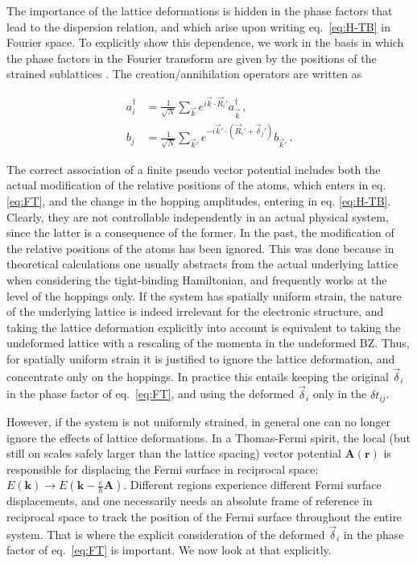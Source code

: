 The importance of the lattice deformations is hidden in the phase factors that lead to the dispersion relation, and which arise upon writing eq.~\eqref{eq:H-TB} in Fourier space.
To explicitly show this dependence, we work in the basis in which the phase factors in the Fourier transform are given by the positions of the strained sublattices \cite{Bena2009}.
The creation/annihilation operators are written as

\begin{subequations}\label{eq:FT}
\begin{align}
a_i^{\dagger}&=\frac{1}{\sqrt{N}}\sum_{\vec{k}}e^{i \vec{k}\cdot\vec{R}_i'}a_{\vec{k}}^{\dagger}\,, \\ 
b_j&=\frac{1}{\sqrt{N}}\sum_{\vec{k}'}e^{-i \vec{k}'\cdot(\vec{R}_i'+\vec{\delta}_j')}b_{\vec{k}'}\,.
\end{align}
\end{subequations}

The correct association of a finite pseudo vector potential includes both the actual modification of the relative positions of the atoms, which enters in eq. \eqref{eq:FT}, and the change in the hopping amplitudes, entering in eq. \eqref{eq:H-TB}.
Clearly, they are not controllable independently in an actual physical system, since the latter is a consequence of the former.
In the past, the modification of the relative positions of the atoms has been ignored.
This was done because in theoretical calculations one usually abstracts from the actual underlying lattice when considering the tight-binding Hamiltonian, and frequently works at the level of the hoppings only.
If the system has spatially uniform strain, the nature of the underlying lattice is indeed irrelevant for the electronic structure, and taking the lattice deformation explicitly into account is equivalent to taking the undeformed lattice with a rescaling of the momenta in the undeformed BZ.
Thus, for spatially uniform strain it is justified to ignore the lattice deformation, and concentrate only on the hoppings.
In practice this entails keeping the original $\vec{\delta}_i$ in the phase factor of eq.~\eqref{eq:FT}, and using the deformed $\vec{\delta}_i$ only in the $\delta t_{ij}$.

However, if the system is not uniformly strained, in general one can no longer ignore the effects of lattice deformations.
In a Thomas-Fermi spirit, the local (but still on scales safely larger than the lattice spacing) vector potential $\bm{A}(\bm{r})$ is responsible for displacing the Fermi surface in reciprocal space: $E(\bm{k})\to E(\bm{k}-\frac{e}{\hbar}\bm{A})$.
Different regions experience different Fermi surface displacements, and one necessarily needs an absolute frame of reference in reciprocal space to track the position of the Fermi surface throughout the entire system.
That is where the explicit consideration of the deformed $\vec{\delta}_i$ in the phase factor of eq.~\eqref{eq:FT} is important.
We now look at that explicitly.

